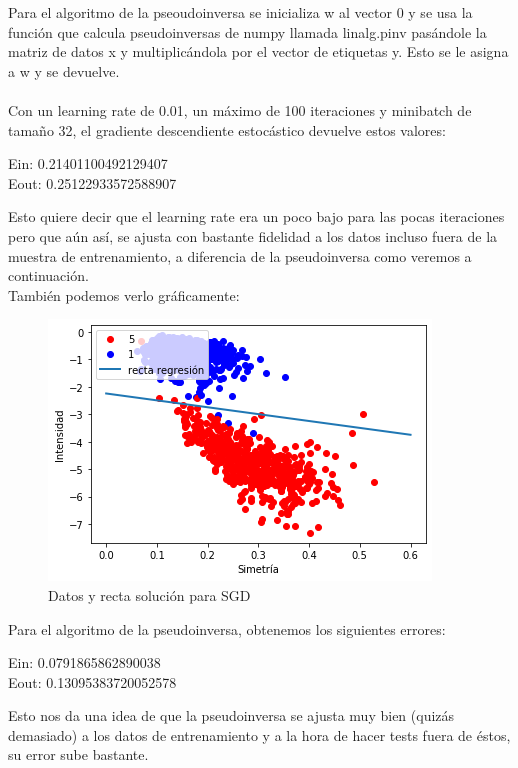 \documentclass[12pt]{article}
\begin{document}
Para el algoritmo de la pseoudoinversa se inicializa w al vector 0 y se usa la función que calcula pseudoinversas de numpy llamada linalg.pinv pasándole la matriz de datos x y multiplicándola por el vector de etiquetas y. Esto se le asigna a w y se devuelve. \\\\
Con un learning rate de 0.01, un máximo de 100 iteraciones y minibatch de tamaño 32, el gradiente descendiente estocástico devuelve estos valores: \\
\begin{center}
Ein:  0.21401100492129407\\
Eout:  0.25122933572588907 \\
\end{center}
Esto quiere decir que el learning rate era un poco bajo para las pocas iteraciones pero que aún así, se ajusta con bastante fidelidad a los datos incluso fuera de la muestra de entrenamiento, a diferencia de la pseudoinversa como veremos a continuación.\\ También podemos verlo gráficamente:
\begin{figure}[H]
\centering
\includegraphics[scale=0.75]{Images/SGD1.png} 
\caption{Datos y recta solución para SGD}
\label{etiqueta}
\end{figure}
Para el algoritmo de la pseudoinversa, obtenemos los siguientes errores:\\
\begin{center}
Ein:  0.0791865862890038\\
Eout:  0.13095383720052578\\
\end{center}
Esto nos da una idea de que la pseudoinversa se ajusta muy bien (quizás demasiado) a los datos de entrenamiento y a la hora de hacer tests fuera de éstos, su error sube bastante.
\end{document}
